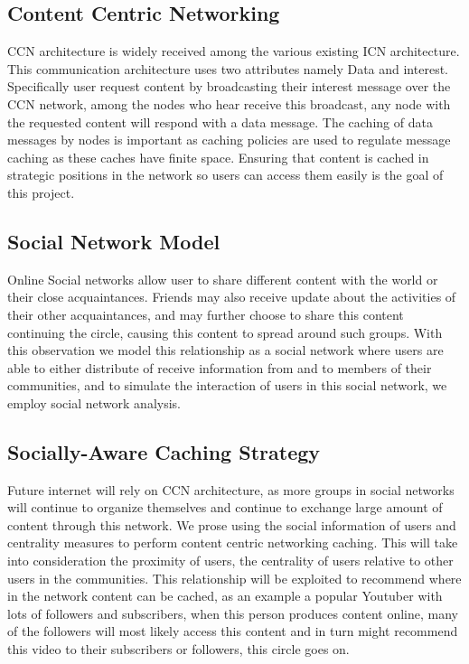 \subsection{Content Centric Networking}
CCN architecture is widely received among the various existing ICN architecture. This communication architecture uses two attributes namely Data and interest. Specifically user request content by broadcasting their interest message over the CCN network, among the nodes who hear receive this broadcast, any node with the requested content will respond with a data message. The caching of data messages by nodes is important as caching policies are used to regulate message caching as these caches have finite space. Ensuring that content is cached in strategic positions in the network so users can access them easily is the goal of this project. 


\subsection{Social Network Model}
Online Social networks allow user to share different content with the world or their close acquaintances.  Friends may also receive update about the activities of their other acquaintances, and may further choose to share this content continuing the circle, causing this content to spread around such groups. With this observation we model this relationship as a social network where users are able to either distribute of receive information from and to members of their communities, and to simulate the interaction of users in this social network, we employ social network analysis.

\subsection{Socially-Aware Caching Strategy}
Future internet will rely on CCN architecture, as more groups in social networks will continue to organize themselves and continue to exchange large amount of content through this network. We prose using the social information of users and centrality measures to perform content centric networking caching. This will take into consideration the proximity of users, the centrality of users relative to other users in the communities. This relationship will be exploited to recommend where in the network content can be cached, as an example a popular Youtuber with lots of followers and subscribers, when this person produces content online, many of the followers will most likely access this content and in turn might recommend this video to their subscribers or followers, this circle goes on. 


